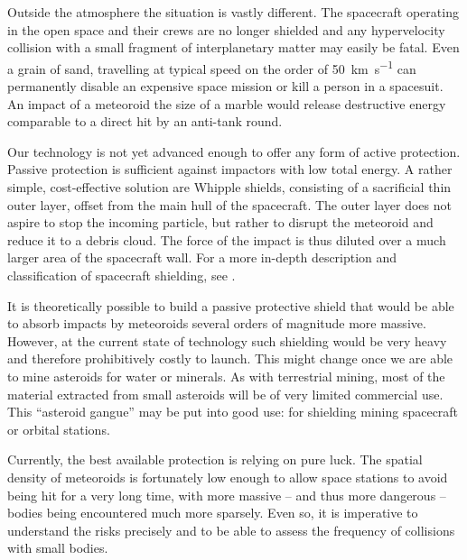 
    Outside the atmosphere the situation is vastly different.
    The spacecraft operating in the open space and their crews are no longer shielded
    and any hypervelocity collision with a small fragment of interplanetary matter may easily be fatal.
    Even a grain of sand, travelling at typical speed on the order of \SI{50}{\kilo\metre\per\second} can permanently disable
    an expensive space mission or kill a person in a spacesuit.
    An impact of a meteoroid the size of a marble would release
    destructive energy comparable to a direct hit by an anti-tank round.

    Our technology is not yet advanced enough to offer any form of active protection.
    Passive protection is sufficient against impactors with low total energy.
    A rather simple, cost-effective solution are Whipple shields, consisting of a sacrificial thin outer layer,
    offset from the main hull of the spacecraft.
    The outer layer does not aspire to stop the incoming particle,
    but rather to disrupt the meteoroid and reduce it to a debris cloud.
    The force of the impact is thus diluted over a much larger area of the spacecraft wall.
    For a more in-depth description and classification of spacecraft shielding, see \citet{nasa-shield}.

    It is theoretically possible to build a passive protective shield that would be able to absorb impacts
    by meteoroids several orders of magnitude more massive.
    However, at the current state of technology such shielding would be very heavy and therefore prohibitively costly to launch.
    This might change once we are able to mine asteroids for water or minerals.
    As with terrestrial mining, most of the material extracted from small asteroids will be of very limited commercial use.
    This ``asteroid gangue'' may be put into good use: for shielding mining spacecraft or orbital stations.

    Currently, the best available protection is relying on pure luck. The spatial density of meteoroids is
    fortunately low enough to allow space stations to avoid being hit for a very long time,
    with more massive -- and thus more dangerous -- bodies being encountered much more sparsely.
    Even so, it is imperative to understand the risks precisely and to be able to assess the frequency
    of collisions with small bodies.

